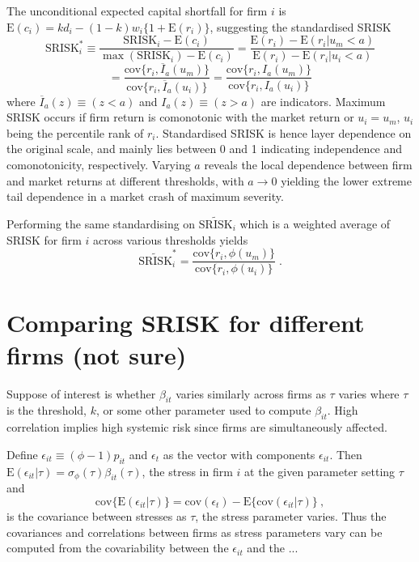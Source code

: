 \documentclass[authoryear]{elsarticle}
\newcommand{\E}{\mathrm{E}}
\newcommand{\cov}{\mathrm{cov}}
\newcommand{\eps}{\epsilon}
\begin{document}
The unconditional expected capital shortfall for firm $i$ is $\E(c_i)=kd_i-(1-k)w_i\{1+\E(r_i)\}$, suggesting the standardised SRISK
$$
\mathrm{SRISK}_i^* \equiv \frac{\mathrm{SRISK}_i-\E(c_i)}{\max(\mathrm{SRISK}_i)-\E(c_i)}
=\frac{\E(r_i)-\E(r_i|u_m<a)}{\E(r_i)-\E(r_i|u_i<a)}
$$
$$
=\frac{\cov\{r_i,\overline{I}_a(u_m)\}}{\cov\{r_i,\overline{I}_a(u_i)\}}
=\frac{\cov\{r_i,I_a(u_m)\}}{\cov\{r_i,I_a(u_i)\}} 
$$
where $\overline{I}_a(z)\equiv (z<a)$ and $I_a(z)\equiv (z>a)$ are indicators. Maximum SRISK occurs if firm return is comonotonic with the market return or $u_i=u_m$, $u_i$ being the percentile rank of $r_i$. Standardised SRISK is hence layer dependence on the original scale, and mainly lies between 0 and 1 indicating independence and comonotonicity, respectively. Varying $a$ reveals the local dependence between firm and market returns at different thresholds, with $a\rightarrow 0$ yielding the lower extreme tail dependence in a market crash of maximum severity.

Performing the same standardising on $\widetilde{\mathrm{SRISK}}_i$ which is a weighted average of SRISK for firm $i$ across various thresholds yields
$$
\widetilde{\mathrm{SRISK}}_i^* = \frac{\cov\{r_i,\phi(u_m)\}}{\cov\{r_i,\phi(u_i)\}}   \;.
$$





\section{Comparing SRISK for different firms (not sure)}

Suppose of interest is whether $\beta_{it}$ varies similarly  across firms as $\tau$ varies where $\tau$ is the threshold, $k$, or some other parameter used to compute $\beta_{it}$. High correlation implies high systemic risk since firms are simultaneously affected.

Define $\eps_{it}\equiv(\phi-1)p_{it}$ and $\eps_t$ as the vector with components $\eps_{it}$.  Then $\E(\eps_{it}|\tau)=\sigma_\phi(\tau)\beta_{it}(\tau)$, the stress in firm $i$ at the given parameter setting $\tau$  and
$$
\cov\{\E(\eps_{it}|\tau)\}=\cov(\eps_{t})-\E\{\cov(\eps_{it}|\tau)\}\ ,
$$
is the covariance between stresses as $\tau$, the stress parameter varies.   Thus the covariances and correlations between firms as stress parameters vary can be computed from the covariability between the $\eps_{it}$ and the ...
\end{document}
